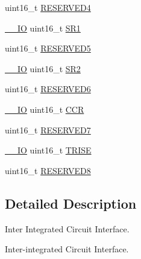 \begin{DoxyCompactItemize}
\item 
uint16\-\_\-t \hyperlink{struct_i2_c___type_def_a05a1a3482d9534ba9ef976e3277040f0}{R\-E\-S\-E\-R\-V\-E\-D4}
\item 
\hyperlink{group___c_m_s_i_s__core__definitions_gaec43007d9998a0a0e01faede4133d6be}{\-\_\-\-\_\-\-I\-O} uint16\-\_\-t \hyperlink{struct_i2_c___type_def_ae1602cd1c9cad449523099c97138f991}{S\-R1}
\item 
uint16\-\_\-t \hyperlink{struct_i2_c___type_def_ae736412dcff4daa38bfa8bf8628df316}{R\-E\-S\-E\-R\-V\-E\-D5}
\item 
\hyperlink{group___c_m_s_i_s__core__definitions_gaec43007d9998a0a0e01faede4133d6be}{\-\_\-\-\_\-\-I\-O} uint16\-\_\-t \hyperlink{struct_i2_c___type_def_a95c7f729b10eb2acafe499d9c9a81a83}{S\-R2}
\item 
uint16\-\_\-t \hyperlink{struct_i2_c___type_def_aaf1b319262f53669f49e244d94955a60}{R\-E\-S\-E\-R\-V\-E\-D6}
\item 
\hyperlink{group___c_m_s_i_s__core__definitions_gaec43007d9998a0a0e01faede4133d6be}{\-\_\-\-\_\-\-I\-O} uint16\-\_\-t \hyperlink{struct_i2_c___type_def_a1775e779008da2b4d1807c2b5033b8a5}{C\-C\-R}
\item 
uint16\-\_\-t \hyperlink{struct_i2_c___type_def_a0f398bdcc3f24e7547c3cb9343111fd0}{R\-E\-S\-E\-R\-V\-E\-D7}
\item 
\hyperlink{group___c_m_s_i_s__core__definitions_gaec43007d9998a0a0e01faede4133d6be}{\-\_\-\-\_\-\-I\-O} uint16\-\_\-t \hyperlink{struct_i2_c___type_def_aaba7a808e4dfae5cc06b197c298af206}{T\-R\-I\-S\-E}
\item 
uint16\-\_\-t \hyperlink{struct_i2_c___type_def_a6e762751c9d5a1e41efb6033a26d8ed8}{R\-E\-S\-E\-R\-V\-E\-D8}
\end{DoxyCompactItemize}


\subsection{Detailed Description}
Inter Integrated Circuit Interface. 

Inter-\/integrated Circuit Interface. 

